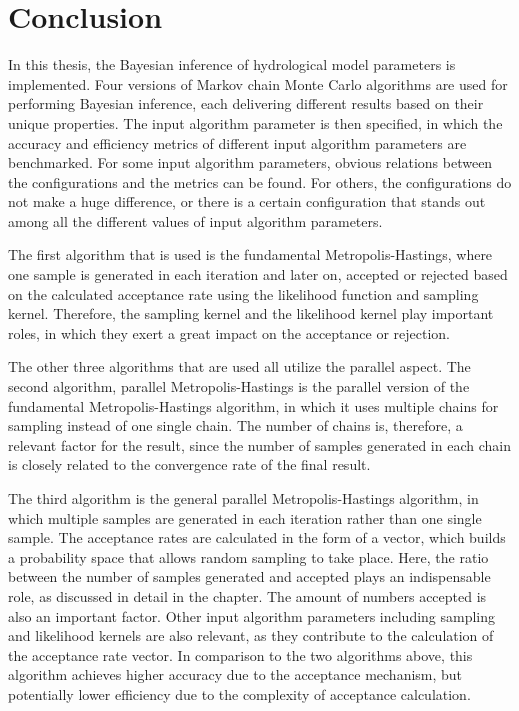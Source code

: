 \chapter{Conclusion}
In this thesis, the Bayesian inference of hydrological model parameters is implemented. Four versions of Markov chain Monte Carlo algorithms are used for performing Bayesian inference, each delivering different results based on their unique properties. The input algorithm parameter is then specified, in which the accuracy and efficiency metrics of different input algorithm parameters are benchmarked. For some input algorithm parameters, obvious relations between the configurations and the metrics can be found. For others, the configurations do not make a huge difference, or there is a certain configuration that stands out among all the different values of input algorithm parameters.

The first algorithm that is used is the fundamental Metropolis-Hastings, where one sample is generated in each iteration and later on, accepted or rejected based on the calculated acceptance rate using the likelihood function and sampling kernel. Therefore, the sampling kernel and the likelihood kernel play important roles, in which they exert a great impact on the acceptance or rejection.

The other three algorithms that are used all utilize the parallel aspect. The second algorithm, parallel Metropolis-Hastings is the parallel version of the fundamental Metropolis-Hastings algorithm, in which it uses multiple chains for sampling instead of one single chain. The number of chains is, therefore, a relevant factor for the result, since the number of samples generated in each chain is closely related to the convergence rate of the final result.

The third algorithm is the general parallel Metropolis-Hastings algorithm, in which multiple samples are generated in each iteration rather than one single sample. The acceptance rates are calculated in the form of a vector, which builds a probability space that allows random sampling to take place. Here, the ratio between the number of samples generated and accepted plays an indispensable role, as discussed in detail in the chapter. The amount of numbers accepted is also an important factor. Other input algorithm parameters including sampling and likelihood kernels are also relevant, as they contribute to the calculation of the acceptance rate vector. In comparison to the two algorithms above, this algorithm achieves higher accuracy due to the acceptance mechanism, but potentially lower efficiency due to the complexity of acceptance calculation.

